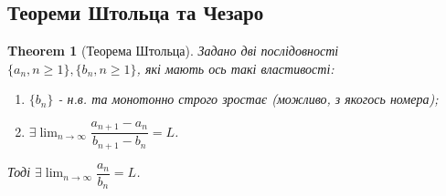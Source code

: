 \documentclass[a4paper, 14pt]{article}
\theoremstyle{theoremdd}
\newtheorem{theorem}{Theorem}[subsection]
\theoremstyle{theoremdd}
\theoremstyle{theoremdd}
\theoremstyle{theoremdd}
\theoremstyle{theoremdd}
\theoremstyle{theoremdd}
\theoremstyle{theoremdd}
\theoremstyle{theoremdd}
\begin{document}
	\subsection{Теореми Штольца та Чезаро}
	\begin{theorem}[Теорема Штольца]
	Задано дві послідовності $\{a_n, n \geq 1\}, \{b_n, n \geq 1\}$, які мають ось такі властивості:
	\begin{enumerate}[nosep,wide=0pt,label={\arabic*)}]
	\item $\{b_n\}$ - н.в. та монотонно строго зростає (можливо, з якогось номера);
	\item $\exists \displaystyle \lim_{n \to \infty} \dfrac{a_{n+1} - a_n}{b_{n+1} - b_n} = L$.
	\end{enumerate}
	Тоді $\exists \displaystyle \lim_{n \to \infty} \dfrac{a_n}{b_n} = L$.
	\end{theorem}
	
\end{document}
